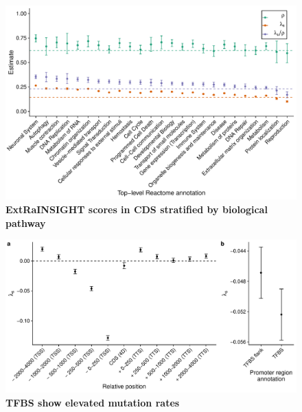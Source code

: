 \documentclass[11pt]{article}
\begin{document}
\begin{figure}[t]
    \centering
    \includegraphics[width=\linewidth]{figures/reactome_cds_ratio.pdf}
    \caption{\textbf{\textbf{ExtRaINSIGHT scores in CDS stratified by biological pathway}}}
    \label{fig:reactome}
\end{figure}

\clearpage 


\begin{figure}[t]
    \centering
    \includegraphics[width=\linewidth]{figures/excess_mutation_rate.pdf}
    \caption{\textbf{\textbf{TFBS show elevated mutation rates}}}
    \label{fig:mutation_model_misspec}
\end{figure}
\end{document}
